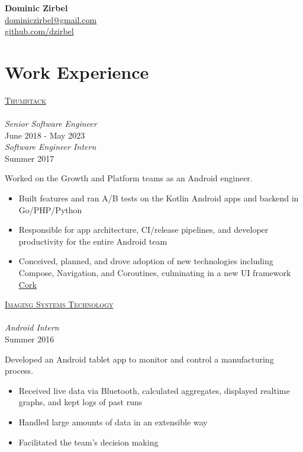 \documentclass[letterpaper,10pt]{article}
\newcommand{\lb}{\vspace{4pt} \\}
\newenvironment{resumecols}[4]
{
    \begin{minipage}[t]{.21\linewidth}
        \begin{flushright}
            \href{#2}{\textsc{#1}} \\
            \lb
            \small{\textit{#3}} \\
            \small{#4}
        \end{flushright}
    \end{minipage}
    \hspace{.004\linewidth}
    \begin{minipage}[t]{.775\linewidth}
}
{
    \end{minipage}
}
\newenvironment{resumecols6}[6]
{
    \begin{minipage}[t]{.21\linewidth}
        \begin{flushright}
            \href{#2}{\textsc{#1}} \\
            \lb
            \small{\textit{#3}} \\
            \small{#4}
            \lb
            \small{\textit{#5}} \\
            \small{#6}
        \end{flushright}
    \end{minipage}
    \hspace{.004\linewidth}
    \begin{minipage}[t]{.775\linewidth}
}
{
    \end{minipage}
}
\begin{document}
\thispagestyle{empty}

\begin{flushright}
    \textbf{\Large{Dominic Zirbel}} \\
    \href{mailto:dominiczirbel@gmail.com}{dominiczirbel@gmail.com} \\
    \href{https://github.com/dzirbel}{github.com/dzirbel}
\end{flushright}

\section{Work Experience}

\begin{resumecols6}{Thumbtack}{https://www.thumbtack.com/about}{Senior Software Engineer}{June 2018 - May 2023}{Software Engineer Intern}{Summer 2017}
    Worked on the Growth and Platform teams as an Android engineer.
    \begin{itemize}
      \item Built features and ran A/B tests on the Kotlin Android apps and backend in Go/PHP/Python
      \item Responsible for app architecture, CI/release pipelines, and developer productivity for the entire Android team
      \item Conceived, planned, and drove adoption of new technologies including Compose, Navigation, and Coroutines, culminating in a new UI framework \href{https://medium.com/thumbtack-engineering/61a24e5e82b6}{\underline{Cork}}
    \end{itemize}
\end{resumecols6}

\vspace{6pt}

\begin{resumecols}{Imaging Systems Technology}{http://www.teamist.com}{Android Intern}{Summer 2016}
    Developed an Android tablet app to monitor and control a manufacturing process.
    \begin{itemize}
      \item Received live data via Bluetooth, calculated aggregates, displayed realtime graphs, and kept logs of past runs
      \item Handled large amounts of data in an extensible way
      \item Facilitated the team's decision making
    \end{itemize}
\end{resumecols}
\end{document}
